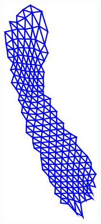 \begin{figure}[t!]
\begin{subfigure}[b]{0.1\textwidth}
            \includegraphics[width=\textwidth]{resources/Fig_Flows/3}

\end{subfigure}
\end{figure}
